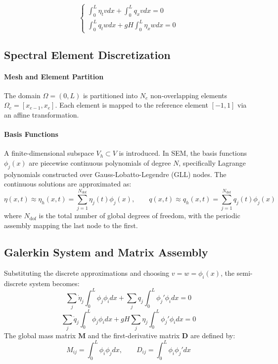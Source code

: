 \begin{equation}
\begin{cases}
\displaystyle \int_{0}^{L} \eta_{t} v dx + \int_{0}^{L} q_{x} v dx = 0 \\[6pt]
\displaystyle \int_{0}^{L} q_{t} w dx + gH \int_{0}^{L} \eta_{x} w dx = 0
\end{cases}
\end{equation}

\subsection{Spectral Element Discretization}

\paragraph{Mesh and Element Partition} The domain \(\Omega = (0,L)\) is partitioned into \(N_e\) non-overlapping elements \(\Omega_e = [x_{e-1}, x_e]\). Each element is mapped to the reference element \([-1, 1]\) via an affine transformation.

\paragraph{Basis Functions} A finite-dimensional subspace \(V_h \subset V\) is introduced. In SEM, the basis functions \(\phi_j(x)\) are piecewise continuous polynomials of degree \(N\), specifically Lagrange polynomials constructed over Gauss-Lobatto-Legendre (GLL) nodes. The continuous solutions are approximated as:
\[
\eta(x,t) \approx \eta_h(x,t) = \sum_{j=1}^{N_{\mathrm{dof}}} \eta_j(t) \phi_j(x), \qquad q(x,t) \approx q_h(x,t) = \sum_{j=1}^{N_{\mathrm{dof}}} q_j(t) \phi_j(x)
\]
where \(N_{\mathrm{dof}}\) is the total number of global degrees of freedom, with the periodic assembly mapping the last node to the first.

\subsection{Galerkin System and Matrix Assembly}

Substituting the discrete approximations and choosing \(v = w = \phi_i(x)\), the semi-discrete system becomes:
\[
\sum_{j} \dot{\eta}_j \int_{0}^{L} \phi_j \phi_i dx + \sum_{j} q_j \int_{0}^{L} \phi_j' \phi_i dx = 0
\]
\[
\sum_{j} \dot{q}_j \int_{0}^{L} \phi_j \phi_i dx + gH \sum_{j} \eta_j \int_{0}^{L} \phi_j' \phi_i dx = 0
\]
The global mass matrix \(\mathbf{M}\) and the first-derivative matrix \(\mathbf{D}\) are defined by:
\[
M_{ij} = \int_{0}^{L} \phi_i \phi_j dx, \qquad D_{ij} = \int_{0}^{L} \phi_i \phi_j' dx
\]

